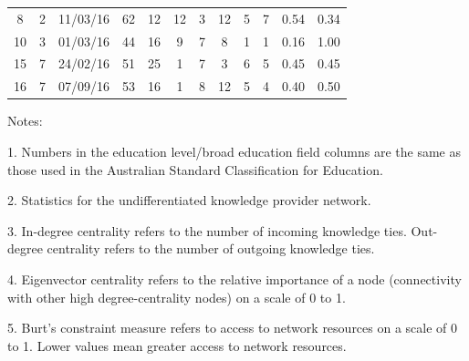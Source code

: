\begin{landscape}
\begin{table}[]
\begin{threeparttable}
\begin{tabular}{@{}cccccccccccc@{}}
				8    & 2        & 11/03/16  & 62  & 12    & 12               & 3         & 12                & 5              & 7               & 0.54             & 0.34  \\
				10   & 3        & 01/03/16  & 44  & 16    & 9                & 7         & 8                 & 1              & 1               & 0.16             & 1.00  \\
				15   & 7        & 24/02/16  & 51  & 25    & 1                & 7         & 3                 & 6              & 5               & 0.45             & 0.45  \\
				16   & 7        & 07/09/16  & 53  & 16    & 1                & 8         & 12                & 5              & 4               & 0.40             & 0.50  \\ \bottomrule
			\end{tabular}
			\begin{tablenotes}
				\small
				\item Notes:
				\item 1. Numbers in the education level/broad education field columns are the same as those used in the Australian Standard Classification for Education.
				\item 2. Statistics for the undifferentiated knowledge provider network.
				\item 3. In-degree centrality refers to the number of incoming knowledge ties. Out-degree centrality refers to the number of outgoing knowledge ties.
				\item 4. Eigenvector centrality refers to the relative importance of a node (connectivity with other high degree-centrality nodes) on a scale of 0 to 1.
				\item 5. Burt's constraint measure refers to access to network resources on a scale of 0 to 1. Lower values mean greater access to network resources.
			\end{tablenotes}
		\end{threeparttable}
	\end{table}
\end{landscape}
